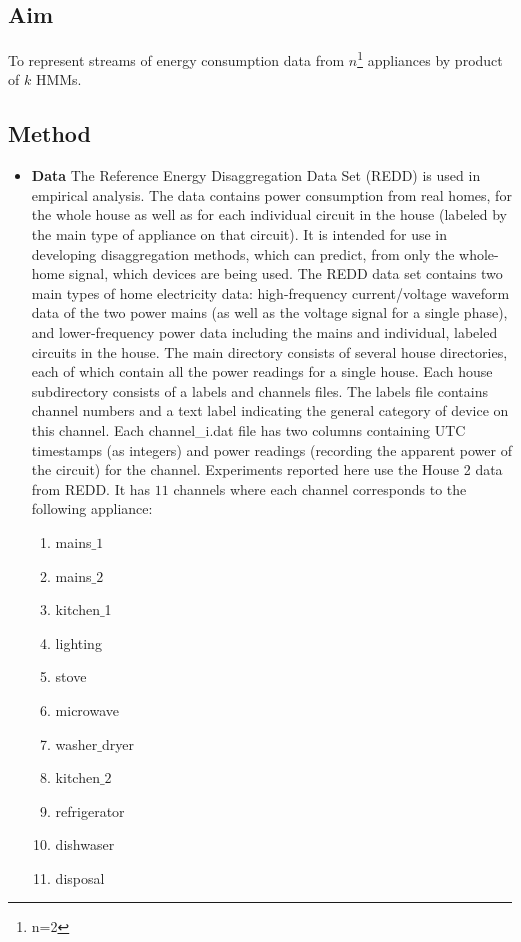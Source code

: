 \documentclass{sig-alternate}
\begin{document}
\subsection{Aim}
 To represent streams of energy consumption data from $n$\footnote{n=2} appliances by product of $k$ HMMs.

\subsection{Method} 
\begin{itemize}
\item \textbf{Data } The Reference Energy Disaggregation Data Set (REDD) is used in empirical analysis. The data contains power consumption from real homes, for the whole house as well as for each individual circuit in
the house (labeled by the main type of appliance on that circuit). It is intended for use in developing disaggregation methods, which can predict, from only the whole-home signal, which devices are being used. The REDD data set contains two main types of home electricity data: high-frequency current/voltage waveform data of the two power mains (as well as the voltage signal for a single phase), and lower-frequency power data including the mains and individual, labeled circuits in the house. The main directory consists of several house directories, each of which contain all the power readings for a single house.  Each house subdirectory consists of a labels and channels files. The labels file contains channel numbers and a text label indicating the general category of device on this channel. Each channel\_i.dat file has two columns containing UTC timestamps (as integers) and power readings (recording the apparent power of the circuit) for the channel.
Experiments reported here use the House 2 data from REDD. It has $11$ channels where each channel corresponds to the following appliance: 
\begin{enumerate}
\item mains$\_1$ 
\item mains$\_2$ 
\item kitchen$\_$1
\item lighting
\item stove 
\item microwave
\item washer$\_$dryer
\item kitchen$\_2$
\item refrigerator
\item dishwaser
\item disposal
\end{enumerate}


\end{itemize}
\end{document}
